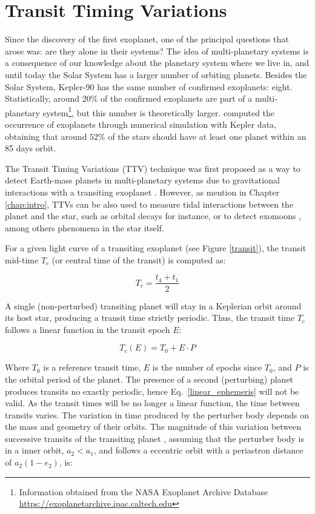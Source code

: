 \section{Transit Timing Variations\label{ttv}}

Since the discovery of the first exoplanet, one of the principal questions that arose was: are they alone in their systems? The idea of multi-planetary systems is a consequence of our knowledge about the planetary system where we live in, and until today the Solar System has a larger number of orbiting planets. Besides the Solar System, Kepler-90 has the same number of confirmed exoplanets: eight. Statistically, around 20\% of the confirmed exoplanets are part of a multi-planetary system\footnote{Information obtained from the NASA Exoplanet Archive Database \url{https://exoplanetarchive.ipac.caltech.edu}}, but this number is theoretically larger. \cite{Fressin2013} computed the occurrence of exoplanets through numerical simulation with Kepler data, obtaining that around $52\%$ of the stars should have at least one planet within an 85 days orbit.

The Transit Timing Variations (TTV) technique was first proposed as a way to detect Earth-mass planets in multi-planetary systems due to gravitational interactions with a transiting exoplanet \citep{Holman2005,Agol2005}. However, as mention in Chapter \ref{chap:intro}, TTVs can be also used to measure tidal interactions between the planet and the star, such as orbital decays for instance, or to detect exomoons \citep{Kipping2009a,Kipping2009b}, among others phenomena in the star itself. 

For a given light curve of a transiting exoplanet (see Figure \ref{transit}), the transit mid-time $T_{c}$ (or central time of the transit) is computed as:

\begin{equation}
T_{c} = \frac{t_{4}+t_{1}}{2}
\end{equation}

A single (non-perturbed) transiting planet will stay in a Keplerian orbit around its host star, producing a transit time strictly periodic. Thus, the transit time $T_c$ follows a linear function in the transit epoch $E$: 

\begin{equation}
T_{c}(E) = T_{0} + E \cdot P
\label{linear_ephemeris} 
\end{equation}

Where $T_0$ is a reference transit time, $E$ is the number of epochs since $T_0$, and $P$ is the orbital period of the planet. The presence of a second (perturbing) planet produces transits no exactly periodic, hence Eq.~\ref{linear_ephemeris} will not be valid. As the transit times will be no longer a linear function,  the time between transits varies.  The variation in time produced by the perturber body depends on the mass and geometry of their orbits. The magnitude of this variation between successive transits of the transiting planet \citep{Holman2005}, assuming that the perturber body is in a inner orbit, $a_2 < a_1$, and follows a eccentric orbit with a periastron distance of $a_2(1-e_2)$, is:

